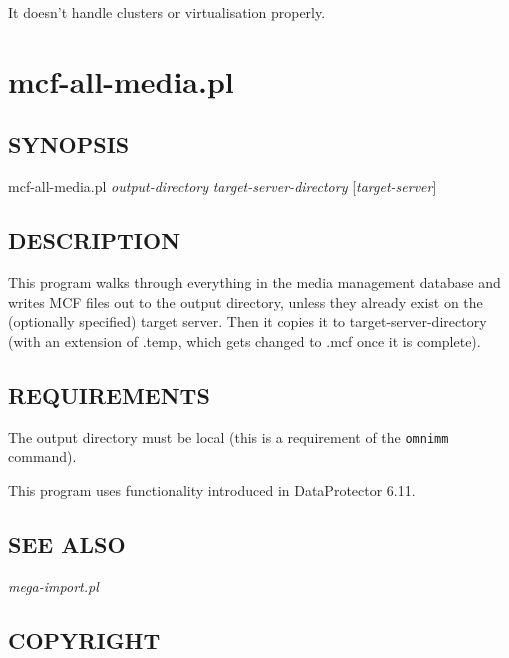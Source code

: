 \documentclass{article}
\begin{document}
It doesn't handle clusters or virtualisation properly.

\clearpage
\section{mcf-all-media.pl\label{mcf-all-media_pl}}




\subsection*{SYNOPSIS\label{mcf-all-media_pl_SYNOPSIS}}


mcf-all-media.pl \textit{output-directory} \textit{target-server-directory} [\textit{target-server}]

\subsection*{DESCRIPTION\label{mcf-all-media_pl_DESCRIPTION}}


This program walks through everything in the media management database and writes MCF files out to the 
output directory, unless they already exist on the (optionally specified) target server. Then it copies it to
target-server-directory (with an extension of .temp, which gets changed to .mcf once it is complete).

\subsection*{REQUIREMENTS\label{mcf-all-media_pl_REQUIREMENTS}}


The output directory must be local (this is a requirement of the \texttt{omnimm} command).



This program uses functionality introduced in DataProtector 6.11.

\subsection*{SEE ALSO\label{mcf-all-media_pl_SEE_ALSO}}


\emph{mega-import.pl}

\subsection*{COPYRIGHT\label{mcf-all-media_pl_COPYRIGHT}}
\end{document}
